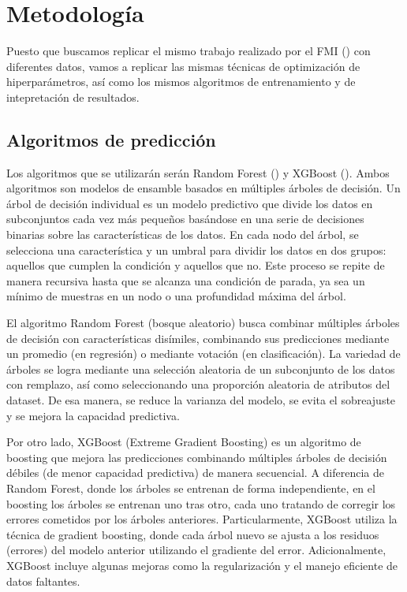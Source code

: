 \documentclass{article}
\begin{document}
\section{Metodología}
Puesto que buscamos replicar el mismo trabajo realizado por el FMI (\cite{Ceb24}) 
con diferentes datos, vamos a replicar las mismas 
técnicas de optimización de hiperparámetros, así como los mismos algoritmos
de entrenamiento y de intepretación de resultados.

\subsection{Algoritmos de predicción}
Los algoritmos que se utilizarán serán Random Forest (\cite{Bre01}) y XGBoost
(\cite{Che16}). Ambos algoritmos son modelos de ensamble basados en múltiples 
árboles de decisión. Un árbol de decisión individual es un modelo predictivo que divide 
los datos en subconjuntos cada vez más pequeños basándose en una serie de decisiones 
binarias sobre las características de los datos. En cada nodo del árbol, se selecciona una 
característica y un umbral para dividir los datos en dos grupos: aquellos que cumplen 
la condición y aquellos que no. Este proceso se repite de manera recursiva hasta que se 
alcanza una condición de parada, ya sea un mínimo de muestras en un nodo o una 
profundidad máxima del árbol.

El algoritmo Random Forest (bosque aleatorio) busca combinar 
múltiples árboles de decisión con características disímiles, combinando sus predicciones
mediante un promedio (en regresión) o mediante votación (en clasificación). 
La variedad de árboles se logra mediante una selección aleatoria de un subconjunto de los 
datos con remplazo, así como seleccionando una proporción aleatoria
de atributos del dataset. De esa manera, se reduce la varianza del modelo, se evita el
sobreajuste y se mejora la capacidad predictiva.

Por otro lado, XGBoost (Extreme Gradient Boosting) es un algoritmo de boosting que mejora 
las predicciones combinando múltiples árboles de decisión débiles (de menor capacidad 
predictiva) de manera secuencial. A diferencia de Random Forest, donde los árboles se 
entrenan de  forma independiente, en el boosting los árboles se entrenan uno tras otro, 
cada uno tratando de corregir los errores cometidos por los árboles anteriores. 
Particularmente, XGBoost utiliza la técnica de gradient boosting, donde cada árbol nuevo 
se ajusta a los residuos (errores) del modelo anterior utilizando el gradiente del error. 
Adicionalmente, XGBoost incluye algunas mejoras como la regularización
y el manejo eficiente de datos faltantes. 
\end{document}
